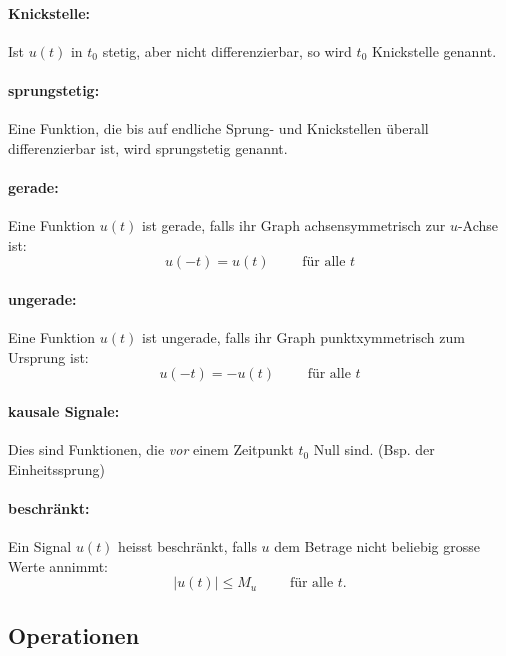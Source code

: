 \paragraph{Knickstelle:}
Ist $u(t)$ in $t_0$ stetig, aber nicht differenzierbar, so wird $t_0$ Knickstelle genannt.
\paragraph{sprungstetig:}
Eine Funktion, die bis auf endliche Sprung- und Knickstellen überall differenzierbar ist, wird sprungstetig genannt.
\paragraph{gerade:} Eine Funktion $u(t)$ ist gerade, falls ihr Graph achsensymmetrisch zur $u$-Achse ist:
\[
	u(-t) = u(t) \qquad \text{ für alle } t
\]
\paragraph{ungerade:} Eine Funktion $u(t)$ ist ungerade, falls ihr Graph punktxymmetrisch zum Ursprung ist:
\[
	u(-t) = -u(t) \qquad \text{ für alle } t
\]
\paragraph{kausale Signale:} Dies sind Funktionen, die \textit{vor} einem Zeitpunkt $t_0$ Null sind. (Bsp. der Einheitssprung)
\paragraph{beschränkt:} Ein Signal $u(t)$ heisst beschränkt, falls $u$ dem Betrage nicht beliebig grosse Werte annimmt:
\[
	\left| u(t) \right| \le M_u	\qquad \text{ für alle } t.
\]


\subsection{Operationen}